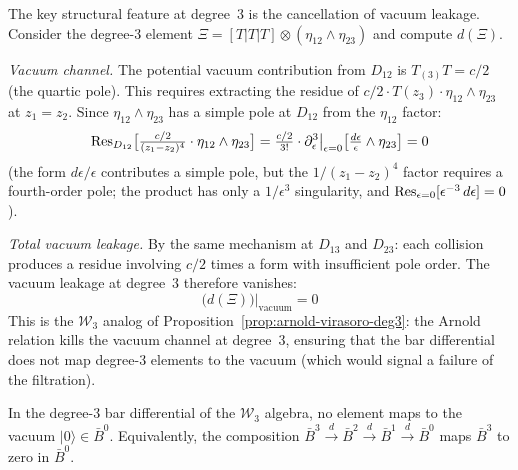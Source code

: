 \begin{computation}
\label{comp:w3-arnold-deg3}

The key structural feature at degree~3 is the cancellation of
vacuum leakage.  Consider the degree-3 element
$\Xi = [T|T|T] \otimes (\eta_{12} \wedge \eta_{23})$ and compute
$d(\Xi)$.

\emph{Vacuum channel.}
The potential vacuum contribution from $D_{12}$ is
$T_{(3)}T = c/2$ (the quartic pole).  This requires extracting the
residue of $c/2 \cdot T(z_3) \cdot \eta_{12} \wedge \eta_{23}$
at $z_1 = z_2$.  Since $\eta_{12} \wedge \eta_{23}$ has a
simple pole at $D_{12}$ from the $\eta_{12}$ factor:
\[
\operatorname{Res}_{D_{12}}\bigl[\tfrac{c/2}{(z_1-z_2)^4}
\cdot \eta_{12} \wedge \eta_{23}\bigr]
= \tfrac{c/2}{3!} \cdot
\partial_\epsilon^3\bigl|_{\epsilon=0}
\bigl[\tfrac{d\epsilon}{\epsilon} \wedge \eta_{23}\bigr] = 0
\]
(the form $d\epsilon/\epsilon$ contributes a simple pole, but the
$1/(z_1-z_2)^4$ factor requires a fourth-order pole; the product
has only a $1/\epsilon^3$ singularity, and
$\operatorname{Res}_{\epsilon=0}[\epsilon^{-3}\,d\epsilon] = 0$).

\emph{Total vacuum leakage.}
By the same mechanism at $D_{13}$ and $D_{23}$: each collision
produces a residue involving $c/2$ times a form with insufficient
pole order.  The vacuum leakage at degree~3 therefore vanishes:
\begin{equation}\label{eq:w3-deg3-no-vacuum}
\bigl(d(\Xi)\bigr)\big|_{\text{vacuum}} = 0
\end{equation}
This is the $\mathcal{W}_3$ analog of
Proposition~\ref{prop:arnold-virasoro-deg3}: the Arnold relation
kills the vacuum channel at degree~3, ensuring that the bar
differential does not map degree-3 elements to the vacuum
(which would signal a failure of the filtration).
\end{computation}

\begin{proposition}
\label{prop:w3-deg3-vacuum}
In the degree-$3$ bar differential of the $\mathcal{W}_3$ algebra,
no element maps to the vacuum $|0\rangle \in \bar{B}^0$.
Equivalently, the composition $\bar{B}^3 \xrightarrow{d}
\bar{B}^2 \xrightarrow{d} \bar{B}^1 \xrightarrow{d}
\bar{B}^0$ maps $\bar{B}^3$ to zero in $\bar{B}^0$.
\end{proposition}

